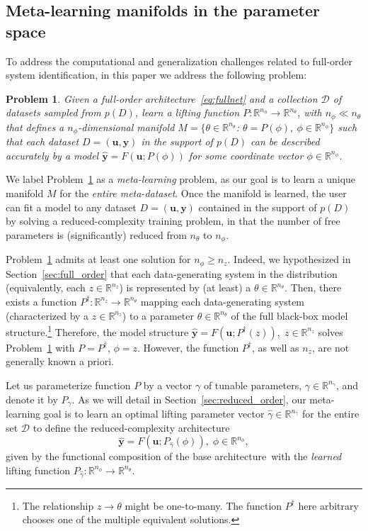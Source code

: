 \documentclass{article}
\newcommand{\base}{{base architecture}}
\newcommand{\seq}[1]{{\mathbf{#1}}}
\newcommand{\R}{\mathbb{R}}
\newcommand{\D}{D}
\newcommand{\latent}{z}
\newcommand{\fullpar}{\theta}
\newcommand{\redpar}{\phi}
\newcommand{\projpar}{\gamma}
\newcommand{\DD}{\mathcal{D}}
\newtheorem{problem}{Problem}%
\begin{document}
\subsection{Meta-learning manifolds in the parameter space}
To address the computational and generalization challenges related to full-order system identification, in this paper we address the following problem:
\begin{problem}
Given a full-order architecture~\eqref{eq:fullnet} and a collection $\DD$ of datasets sampled from $p(\D)$, 
learn a lifting function $P: \R^{n_\redpar} \rightarrow \R^{n_\fullpar}$, with $n_\redpar \ll n_\fullpar$ that defines a $n_\redpar$-dimensional manifold $M=\{\theta\in\R^{n_\fullpar}$: $\theta=P(\redpar),\ \redpar \in \R^{n_\redpar}\}$
such that each dataset $D=(\seq{u},\seq{y})$ in the support of $p(D)$ can be described accurately by a model $\hat{\seq{y}}=F(\seq{u};P(\redpar))$ for some coordinate vector $\redpar\in\R^{n_\redpar}$.
\label{prob:manifold}
\end{problem}
We label Problem~\ref{prob:manifold} as a \emph{meta-learning} problem, as our goal is to learn a unique manifold $M$ for the {\it entire meta-dataset}. Once the manifold is learned, the user can fit a model to any dataset $D=(\seq{u},\seq{y})$ contained in the support of $p(\D)$ by solving a reduced-complexity training problem, in that the number of free parameters is (significantly)  reduced from  $n_\fullpar$ to $n_\redpar$.

Problem~\ref{prob:manifold} admits at least one solution for $n_\redpar \geq n_\latent$. Indeed, we 
hypothesized in Section~\ref{sec:full_order} that each data-generating system in the distribution (equivalently, each $\latent \in \R^{n_\latent}$) is represented by (at least) a $\theta \in \R^{n_\theta}$. Then, there exists a function $P^\dagger : \R^{n_\latent} \rightarrow \R^{n_\theta}$ mapping each data-generating system (characterized by a $\latent \in \R^{n_\latent}$) to a parameter $\fullpar \in \R^{n_\fullpar}$ of the full black-box model structure.\footnote{The relationship $\latent \rightarrow \fullpar$ might be one-to-many. The function $P^\dagger$ here arbitrary chooses one of the multiple equivalent solutions.}
Therefore, the model structure 
$\hat {\seq{y}} = F(\seq{u}; P^\dagger(\latent)),\;  \latent \in \R^{n_\latent}$ solves Problem~\ref{prob:manifold} 
with $P=P^\dagger$, $\phi=z$. However, the function $P^\dagger$, as well as $n_z$, are not generally known a priori. 

Let us parameterize function $P$ by a vector $\projpar$ of tunable parameters, $\projpar \in \R^{n_\projpar}$,
and denote it by $P_\gamma$. As we will detail in Section~\ref{sec:reduced_order}, our meta-learning goal is to learn an optimal lifting parameter vector $\hat \projpar \in \R^{n_\projpar}$ for the entire set $\DD$ to define the reduced-complexity architecture
\begin{equation}
\label{eq:rednet}
\hat {\seq{y}} = F(\seq{u}; P_{\hat \projpar}(\redpar)),\;  \redpar \in  \R^{n_\redpar},
\end{equation}
given by the functional composition of the \base\ with  the \emph{learned} lifting function 
$P_{\hat \projpar} : \R^{n_\redpar} \rightarrow \R^{n_\fullpar}$.
\end{document}
